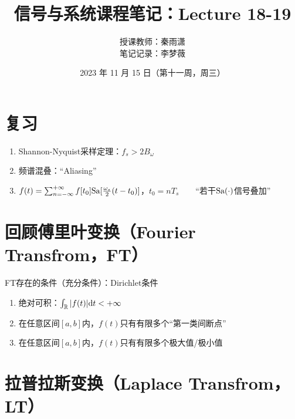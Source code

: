 \documentclass[UTF8]{ctexart}
\begin{document}
\title{信号与系统课程笔记：Lecture 18-19}
\author{授课教师：秦雨潇 \\
        笔记记录：李梦薇}
\date{2023 年 11 月 15 日（第十一周，周三）}
\maketitle

\section{复习}
\begin{enumerate}[label=(\arabic*),itemindent=0pt,labelindent=\parindent,labelwidth=2em,labelsep=5pt,leftmargin=*]
      \item Shannon-Nyquist采样定理：$f_s>2B_\omega$
      \item 频谱混叠：“Aliasing”
      \item $f(t)=\sum_{n=-\infty}^{+\infty}f[t_0]{\rm{Sa}}[\frac{\omega_s}{2}(t-t_0)]$，${t_0=nT_s}\qquad$“若干${\rm{Sa(\cdot)}}$信号叠加”
\end{enumerate}\par

\section{回顾傅里叶变换（Fourier Transfrom，FT）}
FT存在的条件（充分条件）：Dirichlet条件
\begin{enumerate}[label=(\arabic*),itemindent=0pt,labelindent=\parindent,labelwidth=2em,labelsep=5pt,leftmargin=*]
      \item 绝对可积：$\int_{\mathbb{R}}|f(t)|{\rm{d}}t<+\infty$
      \item 在任意区间$[a,b]$内，$f(t)$只有有限多个“第一类间断点”
      \item 在任意区间$[a,b]$内，$f(t)$只有有限多个极大值/极小值
\end{enumerate}

\section{拉普拉斯变换（Laplace Transfrom，LT）}
\end{document}
